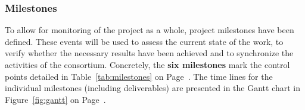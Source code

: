 
\subsubsection{Milestones}
\label{sec:milestones}

To allow for monitoring of the project as a whole, project milestones have been defined.  These events will be used to assess the current state of the work, to verify whether the necessary results have been achieved and to synchronize the activities of the consortium. Concretely, the \textbf{six milestones} mark the control points detailed in Table~\ref{tab:milestones} on Page~\pageref{tab:milestones}.  The time lines for the individual milestones (including deliverables) are presented in the Gantt chart in Figure~\ref{fig:gantt} on Page~\pageref{fig:gantt}.


